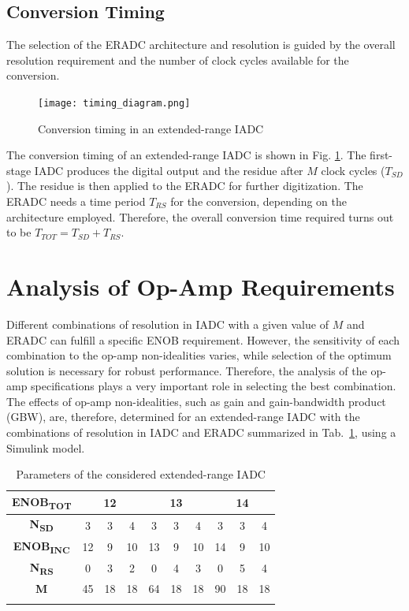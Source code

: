 \subsection{Conversion Timing}
The selection of the ERADC architecture and resolution is guided by the overall resolution requirement and the number of clock cycles available for the conversion.
\begin{figure}
    \centering
    \texttt{[image: timing\_diagram.png]}
    \caption{Conversion timing in an extended-range IADC}
    \label{TIMIG}
\end{figure}
 The conversion timing of an extended-range IADC is shown in Fig. \ref{TIMIG}. The first-stage IADC produces the digital output and the residue after $M$ clock cycles ($T_{SD}$). The residue is then applied to the ERADC for further digitization. The ERADC needs a time period $T_{RS}$ for the conversion, depending on the architecture employed. Therefore, the overall conversion time required turns out to be $T_{TOT}=T_{SD}+T_{RS}$.

\section{Analysis of Op-Amp Requirements}
Different combinations of resolution in IADC with a given value of $M$ and ERADC can fulfill a specific ENOB requirement. However, the sensitivity of each combination to the op-amp non-idealities varies, while selection of the optimum solution is necessary for robust performance. Therefore, the analysis of the op-amp specifications plays a very important role in selecting the best combination. The effects of op-amp non-idealities, such as gain and gain-bandwidth product (GBW), are, therefore, determined for an extended-range IADC with the combinations of resolution in IADC and ERADC summarized in Tab.~\ref{PARAM}, using a Simulink model.
\begin{table}
\centering
\begin{tabular}{c|c|c|c|c|c|c|c|c|c}
\Xhline{3\arrayrulewidth}
\textbf{ENOB\textsubscript{TOT}} & \multicolumn{3}{c|}{\textbf{12}} & \multicolumn{3}{c|}{\textbf{13}} & \multicolumn{3}{c}{\textbf{14}} \\ \hline
\textbf{N\textsubscript{SD}} & 3 & 3 & 4 & 3 & 3 & 4 & 3 & 3 & 4 \\ \hline
\textbf{ENOB\textsubscript{INC}} & 12 & 9 & 10 & 13 & 9 & 10 & 14 & 9 & 10 \\ \hline
\textbf{N\textsubscript{RS}} & 0 & 3 & 2 & 0 & 4 & 3 & 0 & 5 & 4 \\ \hline
\textbf{M} & 45 & 18 & 18 & 64 & 18 & 18 & 90 & 18 & 18 \\ \Xhline{3\arrayrulewidth}
\end{tabular}
\caption{Parameters of the considered extended-range IADC}
\label{PARAM}
\end{table}

